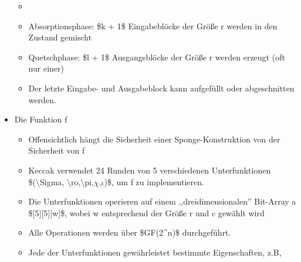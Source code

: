 \documentclass[a4paper]{article}
\begin{document}
\begin{multicols}{3}
\begin{itemize}
              \begin{itemize}
                  \item
                  \item
                        Absorptionsphase: \$k + 1\$ Eingabeblöcke der Größe r werden in den
                        Zustand gemischt
                  \item
                        Quetschphase: \$l + 1\$ Ausgangsblöcke der Größe r werden erzeugt
                        (oft nur einer)
                  \item
                        Der letzte Eingabe- und Ausgabeblock kann aufgefüllt oder
                        abgeschnitten werden.
              \end{itemize}
        \item
              Die Funktion f

              \begin{itemize}
                  \item
                        Offensichtlich hängt die Sicherheit einer Sponge-Konstruktion von
                        der Sicherheit von f
                  \item
                        Keccak verwendet 24 Runden von 5 verschiedenen Unterfunktionen
                        \$(\textbackslash Sigma, \textbackslash ro,\textbackslash pi,$\chi$,$\iota$)\$,
                        um f zu implementieren.
                  \item
                        Die Unterfunktionen operieren auf einem ,,dreidimensionalen''
                        Bit-Array a \${[}5{]}{[}5{]}{[}w{]}\$, wobei w entsprechend der
                        Größe r und c gewählt wird
                  \item
                        Alle Operationen werden über \$GF(2\^{}n)\$ durchgeführt.
                  \item
                        Jede der Unterfunktionen gewährleistet bestimmte Eigenschaften, z.B,


\end{itemize}
\end{itemize}
\end{multicols}
\end{document}
